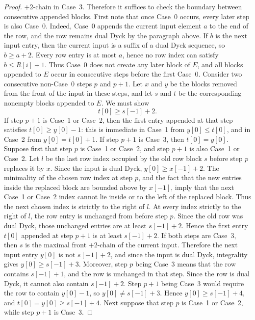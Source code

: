 \documentclass[11pt]{article}
\theoremstyle{plain}
\theoremstyle{definition}
\theoremstyle{remark}
\begin{document}
\begin{proof}
\(+2\)-chain in Case~3.  Therefore it suffices to check the boundary between
consecutive appended blocks.
First note that once Case~0 occurs, every later step is also Case~0.  Indeed,
Case~0 appends the current input element \(a\) to the end of the row, and the
row remains dual Dyck by the paragraph above.  If \(b\) is the next input entry,
then the current input is a suffix of a dual Dyck sequence, so \(b\ge a+2\).
Every row entry is at most \(a\), hence no row index can satisfy
\(b\le R[i]+1\).  Thus Case~0 does not create any later block of \(E\), and all
blocks appended to \(E\) occur in consecutive steps before the first Case~0.
Consider two consecutive non-Case~0 steps \(p\) and \(p+1\).  Let \(x\) and
\(y\) be the blocks removed from the front of the input in these steps, and let
\(s\) and \(t\) be the corresponding nonempty blocks appended to \(E\).  We must
show
\[
  t[0]\ge s[-1]+2.
\]
If step \(p+1\) is Case~1 or Case~2, then the first entry appended at that step
satisfies \(t[0]\ge y[0]-1\): this is immediate in Case~1 from \(y[0]\le t[0]\),
and in Case~2 from \(y[0]=t[0]+1\).  If step \(p+1\) is Case~3, then
\(t[0]=y[0]\).
Suppose first that step \(p\) is Case~1 or Case~2, and step \(p+1\) is also
Case~1 or Case~2.  Let \(l\) be the last row index occupied by the old row block
\(s\) before step \(p\) replaces it by \(x\).  Since the input is dual Dyck,
\(y[0]\ge x[-1]+2\).  The minimality of the chosen row index at step \(p\), and
the fact that the new entries inside the replaced block are bounded above by
\(x[-1]\), imply that the next Case~1 or Case~2 index cannot lie inside or to
the left of the replaced block.  Thus the next chosen index is strictly to the
right of \(l\).  At every index strictly to the right of \(l\), the row entry is
unchanged from before step \(p\).  Since the old row was dual Dyck, those
unchanged entries are at least \(s[-1]+2\).  Hence the first entry \(t[0]\)
appended at step \(p+1\) is at least \(s[-1]+2\).
If both steps are Case~3, then \(s\) is the maximal front \(+2\)-chain of the
current input.  Therefore the next input entry \(y[0]\) is not \(s[-1]+2\), and
since the input is dual Dyck, integrality gives \(y[0]\ge s[-1]+3\).  Moreover,
step \(p\) being Case~3 means that the row contains \(s[-1]+1\), and the row is
unchanged in that step.  Since the row is dual Dyck, it cannot also contain
\(s[-1]+2\).  Step \(p+1\) being Case~3 would require the row to contain
\(y[0]-1\), so \(y[0]\ne s[-1]+3\).  Hence \(y[0]\ge s[-1]+4\), and
\(t[0]=y[0]\ge s[-1]+4\).
Next suppose that step \(p\) is Case~1 or Case~2, while step \(p+1\) is Case~3.

\end{proof}
\end{document}
